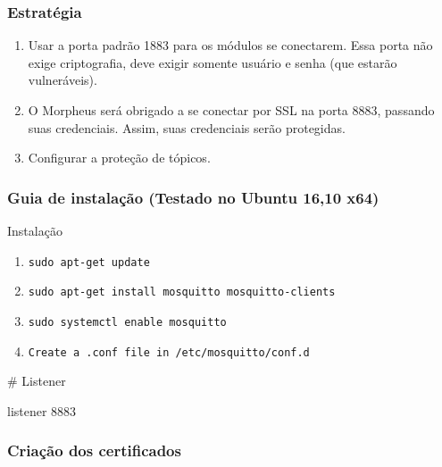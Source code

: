 \subsubsection{Estratégia}
\begin{enumerate}
\item Usar a porta padrão 1883 para os módulos se conectarem. Essa porta não exige criptografia, deve exigir somente usuário e senha (que estarão vulneráveis).
\item O Morpheus será obrigado a se conectar por SSL na porta 8883, passando suas credenciais. Assim, suas credenciais serão protegidas.
\item Configurar a proteção de tópicos.
\end{enumerate}

\subsubsection{Guia de instalação (Testado no Ubuntu 16,10 x64)}
Instalação
\begin{enumerate}
\item \lstinline{sudo apt-get update}
\item \lstinline{sudo apt-get install mosquitto mosquitto-clients}
\item \lstinline{sudo systemctl enable mosquitto}
\item \lstinline{Create a .conf file in /etc/mosquitto/conf.d}
\end{enumerate}


\# Listener

listener 8883

\subsubsection{Criação dos certificados}

